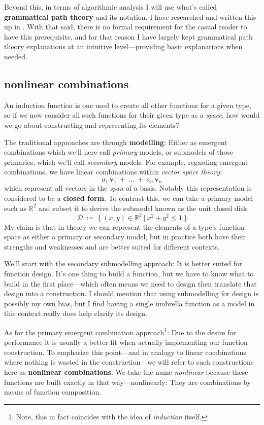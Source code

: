 \documentclass[twoside]{article}
\newcommand{\strong}[1]{{\bfseries #1}}
\newcommand{\bv}[1][v]{\mathbf{#1}}
\begin{document}
Beyond this, in terms of algorithmic analysis I will use what's called \strong{grammatical path theory} and its notation.
I have researched and written this up in \cite{nikfs}. With that said, there is no formal requirement for the casual
reader to have this prerequisite, and for that reason I have largely kept grammatical path theory explanations at
an intuitive level---providing basic explanations when needed.

\subsection*{nonlinear combinations}

An induction function is one used to create all other functions for a given type, so if we now consider all such
functions for their given type as a \emph{space}, how would we go about constructing and representing its elements?

The traditional approaches are through \strong{modelling}: Either as emergent combinations which we'll here call
\emph{primary} models, or submodels of those primaries, which we'll call \emph{secondary} models. For example,
regarding emergent combinations, we have linear combinations within \emph{vector space theory}:
$$ a_1\,\bv_1\ +\ \ldots\ +\ a_n\,\bv_n $$
which represent all vectors in the \emph{span} of a basis. Notably this representation is considered to be
a \strong{closed form}. To contrast this, we can take a primary model such as $ \mathbb{R}^2 $ and subset
it to derive the submodel known as the unit closed disk:
$$ \mathcal{D}\ :=\ \{\ (x,y)\in\mathbb{R}^2\ |\ x^2+y^2 \le 1\ \} $$
My claim is that in theory we can represent the elements of a type's function space as either a primary or secondary
model, but in practice both have their strengths and weaknesses and are better suited for different contexts.

We'll start with the secondary submodelling approach: It is better suited for function design. It's one thing to build
a function, but we have to know what to build in the first place---which often means we need to design then translate
that design into a construction. I should mention that using submodelling for design is possibly my own bias,
but I find having a single umbrella function as a model in this context really does help clarify its design.

As for the primary emergent combination approach\footnote{Note, this in fact coincides with the idea of \emph{induction}
itself.}: Due to the desire for performance it is usually a better fit when actually implementing our function construction.
To emphasize this point---and in analogy to linear combinations where nothing is wasted in the construction---we will refer
to such constructions here as \strong{nonlinear combinations}. We take the name \emph{nonlinear} because these functions
are built exactly in that way---nonlinearly: They are combinations by means of function composition.
\end{document}
